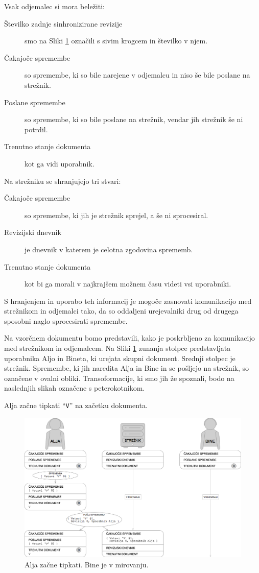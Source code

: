 \documentclass[a4paper, 12pt, twoside]{book}
\begin{document}
Vsak odjemalec si mora beležiti:
\begin{description}
	\item[Številko zadnje sinhronizirane revizije] smo na Sliki \ref{pc1} označili s sivim krogcem in številko v njem.
	\item[Čakajoče spremembe] so spremembe, ki so bile narejene v odjemalcu in niso še bile poslane na strežnik.
	\item[Poslane spremembe] so spremembe, ki so bile poslane na strežnik, vendar jih strežnik še ni potrdil.
	\item[Trenutno stanje dokumenta] kot ga vidi uporabnik.
\end{description}

Na strežniku se shranjujejo tri stvari:
\begin{description}
	\item[Čakajoče spremembe] so spremembe, ki jih je strežnik sprejel, a še ni sprocesiral.
	\item[Revizijski dnevnik] je dnevnik v katerem je celotna zgodovina sprememb.
	\item[Trenutno stanje dokumenta] kot bi ga morali v najkrajšem možnem času videti vsi uporabniki.
\end{description}

S hranjenjem in uporabo teh informacij je mogoče zasnovati komunikacijo med strežnikom in odjemalci tako, da so oddaljeni urejevalniki drug od drugega sposobni naglo sprocesirati spremembe.

Na vzorčnem dokumentu bomo predstavili, kako je poskrbljeno za komunikacijo med strežnikom in odjemalcem. Na Sliki \ref{pc1} zunanja stolpce predstavljata uporabnika Aljo in Bineta, ki urejata skupni dokument. Srednji stolpec je strežnik. Spremembe, ki jih naredita Alja in Bine in se pošljejo na strežnik, so označene v ovalni obliki. Transoformacije, ki smo jih že spoznali, bodo na naslednjih slikah označene s peterokotnikom.

Alja začne tipkati “{\tt V}” na začetku dokumenta.

\begin{figure}[placement h]
\begin{center}
\includegraphics[width=14cm]{pc1.png}
\end{center}
\caption{Alja začne tipkati. Bine je v mirovanju.}
\label{pc1}
\end{figure}
\end{document}
